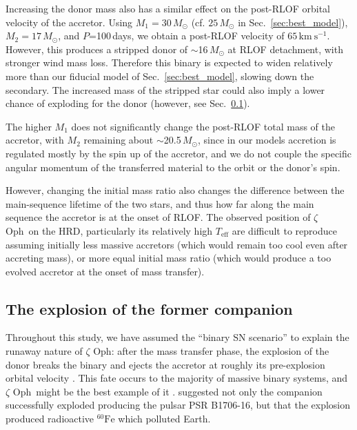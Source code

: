 \documentclass[twocolumn,twocolappendix,trackchanges]{aastex63}
\newcommand{\kms}{{\mathrm{km\ s^{-1}}}}
\DeclareRobustCommand{\Secref}[1]{Sec.~\ref{#1}}
\newcommand{\zoph}{$\zeta$ Oph}
\begin{document}
Increasing the donor mass also has a similar effect on the post-RLOF orbital velocity of the accretor. Using
$M_1=30\,M_\odot$ (cf.
$25\,M_\odot$ in \Secref{sec:best_model}),
$M_2=17\,M_\odot$, and
$P$=100\,days, we obtain a post-RLOF velocity of
$65\,\kms$. However, this produces a stripped donor of
$\sim$16\,$M_\odot$ at RLOF detachment, with stronger wind mass loss. Therefore this binary is expected to widen relatively more than our fiducial model of \Secref{sec:best_model}, slowing down the secondary. The increased mass of the stripped star could also imply a lower chance of exploding for the donor (however, see \Secref{sec:SN_comp}).

The higher $M_1$ does not significantly change the post-RLOF total
mass of the accretor, with $M_2$ remaining about $\sim$20.5\,$M_\odot$, since
in our models accretion is regulated mostly by the spin up of the
accretor, and we do not couple the specific angular momentum of the transferred
material to the orbit or the donor's spin.

However, changing the initial mass ratio also changes the difference
between the main-sequence lifetime of the two stars, and thus how far
along the main sequence the accretor is at the onset of RLOF. The observed
position of \zoph\ on the HRD, particularly its relatively high
$T_\mathrm{eff}$ are difficult to reproduce assuming initially less
massive accretors (which would remain too cool even after accreting
mass), or more equal initial mass ratio (which would produce a too
evolved accretor at the onset of mass transfer).

\subsection{The explosion of the former companion}
\label{sec:SN_comp}

Throughout this study, we have assumed the ``binary SN scenario'' to
explain the runaway nature of \zoph:
after the mass transfer phase, the explosion of the donor breaks the
binary and ejects the accretor at roughly its pre-explosion orbital
velocity \citep[e.g.,][]{renzo:19walk}. This fate occurs to the
majority of massive binary systems, and \zoph\ might be the best
example of it \citep[e.g.,][]{blaauw:52, blaauw:61,
  hoogerwerf:00}. \cite{neuhauser:20} suggested not only the companion
successfully exploded producing the pulsar PSR B1706-16, but that the
explosion produced radioactive $^{60}\mathrm{Fe}$ which polluted
Earth.
\end{document}
